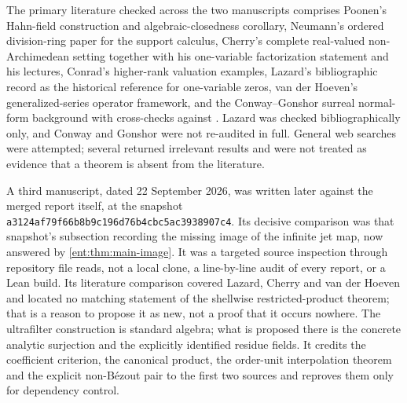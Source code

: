 \documentclass[11pt]{article}
\theoremstyle{plain}
\theoremstyle{plain}
\theoremstyle{plain}
\theoremstyle{definition}
\theoremstyle{definition}
\theoremstyle{definition}
\theoremstyle{definition}
\theoremstyle{remark}
\begin{document}
The primary literature checked across the two manuscripts comprises Poonen's
Hahn-field construction and algebraic-closedness corollary, Neumann's ordered
division-ring paper for the support calculus, Cherry's complete real-valued
non-Archimedean setting together with his one-variable factorization
statement and his lectures, Conrad's higher-rank valuation examples, Lazard's
bibliographic record as the historical reference for one-variable zeros, van
der Hoeven's generalized-series operator framework, and the Conway--Gonshor
surreal normal-form background with cross-checks against
\cite{ADH,BournezGuilmant}. Lazard was checked bibliographically only, and
Conway and Gonshor were not re-audited in full. General web searches were
attempted; several returned irrelevant results and were not treated as
evidence that a theorem is absent from the literature.

A third manuscript, dated 22 September 2026, was written later against the
merged report itself, at the snapshot
\texttt{a3124af79f66b8b9c196\allowbreak d76b4cbc5ac3938907c4}. Its decisive comparison
was that snapshot's subsection recording the missing image of the infinite
jet map, now answered by \cref{ent:thm:main-image}. It was a targeted source
inspection through repository file reads, not a local clone, a line-by-line
audit of every report, or a Lean build. Its literature comparison covered
Lazard, Cherry and van der Hoeven and located no matching statement of the
shellwise restricted-product theorem; that is a reason to propose it as new,
not a proof that it occurs nowhere. The ultrafilter construction is standard
algebra; what is proposed there is the concrete analytic surjection and the
explicitly identified residue fields. It credits the coefficient criterion,
the canonical product, the order-unit interpolation theorem and the explicit
non-B\'ezout pair to the first two sources and reproves them only for
dependency control.
\end{document}
